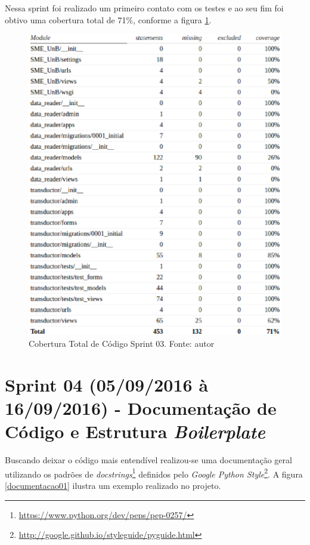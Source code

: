 \vfill
\pagebreak

Nessa sprint foi realizado um primeiro contato com os testes e ao seu fim foi obtivo uma cobertura total de 71\%, conforme a figura \ref{cobertura01}.

\begin{figure}[!htpb]
    \centering
    \includegraphics[keepaspectratio=true,scale=0.5]{figuras/cobertura01.eps}
    \caption{Cobertura Total de Código Sprint 03. Fonte: autor}
    \label{cobertura01}
\end{figure}

\section{Sprint 04 (05/09/2016 à 16/09/2016) - Documentação de Código e Estrutura \textit{Boilerplate}}
Buscando deixar o código mais entendível realizou-se uma documentação geral utilizando os padrões de \textit{docstrings}\footnote{\url{https://www.python.org/dev/peps/pep-0257/}} definidos pelo \textit{Google Python Style}\footnote{\url{http://google.github.io/styleguide/pyguide.html}}. A figura \ref{documentacao01} ilustra um exemplo realizado no projeto.


